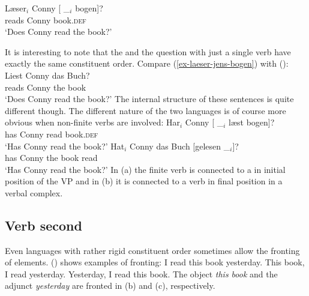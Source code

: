 \ex
\gll Læser$_i$ Conny [ \_$_i$ bogen]?\\
     reads     Conny {}        {}     book.\textsc{def}\\
\glt `Does Conny read the book?'
\zl

It is interesting to note that the  and the  question with just a single verb have exactly
the same constituent order. Compare (\ref{ex-laeser-jens-bogen}) with ():
\ea
\gll Liest Conny das Buch?\\
     reads Conny the book\\ \german
\glt `Does Conny read the book?'
\z
The internal structure of these sentences is quite different though. The different nature of the two
languages is of course more obvious when non-finite verbs are involved:
\eal
\ex
\gll Har$_i$ Conny [ \_$_i$ læst bogen]?\\
     has Conny {} {} read book.\textsc{def}\\\danish
\glt `Has Conny read the book?'
\ex
\gll Hat$_i$ Conny das Buch [gelesen \_$_i$]?\\
     has Conny the book \spacebr{}read\\ \german
\glt `Has Conny read the book?'
\zl
In (a) the finite verb is connected to a  in initial position of the VP and in
(b) it is connected to a verb in final position in a verbal complex.%


\subsection{Verb second}
\label{sce-verb-second}

Even languages with rather rigid constituent order sometimes allow the fronting of elements.
() shows  examples of fronting:
\eal
\ex I read this book yesterday.
\ex This book, I read yesterday.
\ex Yesterday, I read this book.
\zl
The object \emph{this book} and the adjunct \emph{yesterday} are fronted in (b) and
(c), respectively.

